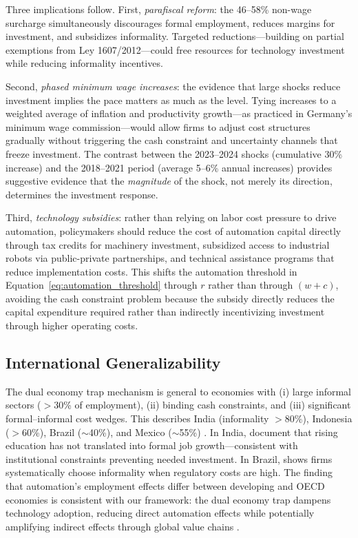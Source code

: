 \documentclass[a4paper,fleqn]{cas-sc}
\begin{document}
Three implications follow. First, \emph{parafiscal reform}: the 46--58\% non-wage surcharge simultaneously discourages formal employment, reduces margins for investment, and subsidizes informality. Targeted reductions---building on partial exemptions from Ley 1607/2012---could free resources for technology investment while reducing informality incentives.

Second, \emph{phased minimum wage increases}: the evidence that large shocks reduce investment implies the pace matters as much as the level. Tying increases to a weighted average of inflation and productivity growth---as practiced in Germany's minimum wage commission---would allow firms to adjust cost structures gradually without triggering the cash constraint and uncertainty channels that freeze investment. The contrast between the 2023--2024 shocks (cumulative 30\% increase) and the 2018--2021 period (average 5--6\% annual increases) provides suggestive evidence that the \emph{magnitude} of the shock, not merely its direction, determines the investment response.

Third, \emph{technology subsidies}: rather than relying on labor cost pressure to drive automation, policymakers should reduce the cost of automation capital directly through tax credits for machinery investment, subsidized access to industrial robots via public-private partnerships, and technical assistance programs that reduce implementation costs. This shifts the automation threshold in Equation~\eqref{eq:automation_threshold} through $r$ rather than through $(w + c)$, avoiding the cash constraint problem because the subsidy directly reduces the capital expenditure required rather than indirectly incentivizing investment through higher operating costs.

\subsection{International Generalizability}
\label{subsec:generalizability}

The dual economy trap mechanism is general to economies with (i) large informal sectors ($>$30\% of employment), (ii) binding cash constraints, and (iii) significant formal--informal cost wedges. This describes India (informality $>$80\%), Indonesia ($>$60\%), Brazil ($\sim$40\%), and Mexico ($\sim$55\%) \citep{laporta2014, arias2023informality}. In India, \citet{mehrotra2019india} document that rising education has not translated into formal job growth---consistent with institutional constraints preventing needed investment. In Brazil, \citet{ulyssea2018} shows firms systematically choose informality when regulatory costs are high. The \citet{carbonero2020robots} finding that automation's employment effects differ between developing and OECD economies is consistent with our framework: the dual economy trap dampens technology adoption, reducing direct automation effects while potentially amplifying indirect effects through global value chains \citep{artuc2023robots}.
\end{document}
